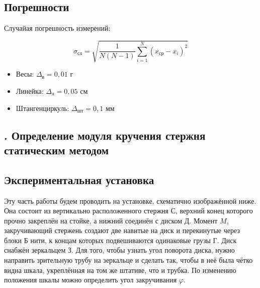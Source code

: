 \documentclass[a4paper, 12pt]{article}
\newcommand{\RomanNumeralCaps}[1]
    {\MakeUppercase{\romannumeral #1}}
\begin{document}
    \bigskip

    \begin{center}
        \subsection*{Погрешности}
    \end{center}

    \begin{center}
        Случайая погрешность измерений:

    \bigskip
    
    \begin{equation}
        \sigma_\text{сл}=\sqrt{\frac{1}{N\left( N - 1 \right)}\sum_{i=1}^{N}\left( x_\text{ср} - x_i \right)^2 }
    \end{equation}
    
    \bigskip
    
    
    \begin{itemize}
        
        \item Весы: $\Delta_{\text{в}} = 0,01 \text{ г}$
        \item Линейка: $\Delta_{\text{л}} = 0,05 \text{ см}$
        \item Штангенциркуль: $\Delta_{\text{шт}} = 0,1 \text{ мм}$
    
    \end{itemize}
    
    \end{center}
    
    \begin{center}
        \section*{\RomanNumeralCaps{1}. Определение модуля кручения стержня статическим методом}     
    \end{center}

    \bigskip

    \begin{center}
        \subsection*{Экспериментальная установка}
    \end{center}

    Эту часть работы будем проводить на установке, схематично изображённой ниже. Она состоит из вертикально расположенного стержня С, верхний конец которого прочно закреплён на стойке, а нижний соединён с диском Д. Момент $M$, закручивающий стержень создают две навитые на диск и перекинутые через блоки Б нити, к концам которых подвешиваются одинаковые грузы Г. Диск снабжён зеркальцем З. Для того, чтобы узнать угол поворота диска, нужно направить зрительную трубу на зеркальце и сделать так, чтобы в неё была чётко видна шкала, укреплённая на том же штативе, что и трубка. По изменению положения шкалы можно определить угол закручивания $\varphi$.
\end{document}
